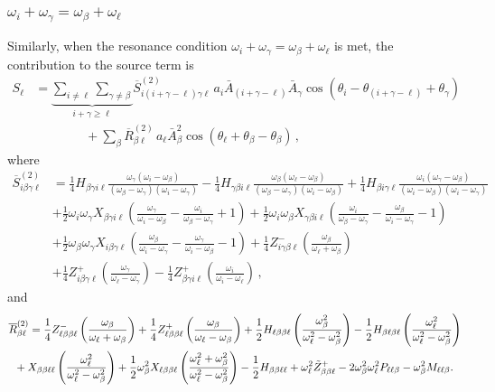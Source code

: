 \documentclass[letterpaper,11pt]{article}
\newcommand{\oi}{\omega_i}
\newcommand{\ol}{\omega_\ell}
\newcommand{\obet}{\omega_{\beta}}
\newcommand{\ogam}{\omega_\gamma}
\begin{document}

\subsubsection{$\oi + \ogam = \obet + \ol$}
\label{ssec: intpluschi2}

Similarly, when the resonance condition $\oi + \ogam = \obet + \ol$ is met, the contribution to the source term is
\begin{align}
\label{intpluschi2 source}
S_\ell &= \underbrace{\sum_{i \neq \ell} \sum_{\gamma \neq \beta}}_{i + \gamma \geq \ell} \overline{S}^{(2)}_{i (i + \gamma - \ell) \gamma \ell} \, a_i \bar A_{(i + \gamma - \ell)} \bar A_\gamma \cos \left( \theta_i - \theta_{(i + \gamma - \ell)}  + \theta_\gamma \right) \nonumber \\
%
& \qquad \qquad + \sum_\beta \overline{R}^{(2)}_{\beta\ell} \, a_\ell \bar A_\beta^2 \cos \left( \theta_\ell + \theta_\beta - \theta_\beta \right) \, ,
\end{align}
where
\begin{align}
\overline{S}^{(2)}_{i\beta\gamma\ell} &= \frac{1}{4} H_{\beta\gamma i\ell} \frac{\ogam (\oi - \obet)}{(\obet - \ogam)(\oi - \ogam)} - \frac{1}{4} H_{\gamma\beta i \ell} \frac{\obet(\ol - \obet)}{(\obet - \ogam)(\oi - \obet)} + \frac{1}{4} H_{\beta i \gamma\ell} \frac{\oi (\ogam - \obet)}{(\oi - \obet)(\oi - \ogam)} \nonumber \\
%
& + \frac{1}{2} \oi \ogam X_{\beta\gamma i \ell} \left( \frac{\ogam}{\oi - \obet} - \frac{\oi}{\obet - \ogam} + 1 \right) + \frac{1}{2} \oi \obet X_{\gamma\beta i \ell} \left( \frac{\oi}{\obet - \ogam} - \frac{\obet}{\oi - \ogam} - 1 \right) \nonumber \\
%
& + \frac{1}{2} \obet \ogam X_{i\beta\gamma\ell} \left( \frac{\obet}{\oi - \ogam} - \frac{\ogam}{\oi - \obet} - 1 \right)  + \frac{1}{4} Z^-_{i\gamma\beta\ell} \left( \frac{\obet}{\ol + \obet}\right)  \nonumber \\
%
&
+ \frac{1}{4} Z^+_{i\beta\gamma\ell} \left( \frac{\ogam}{\ol - \ogam}\right) - \frac{1}{4}Z^+_{\beta\gamma i \ell} \left( \frac{\oi}{\oi - \ol} \right) \, ,
\end{align}
and
\begin{align}
\overline{R}^{(2)}_{\beta\ell} &= \frac{1}{4} Z^-_{\ell\beta\beta\ell} \left( \frac{\obet}{\ol + \obet} \right) + \frac{1}{4} Z^+_{\ell\beta\beta\ell} \left( \frac{\obet}{\ol - \obet} \right) + \frac{1}{2} H_{\ell\beta\beta\ell} \left( \frac{\obet^2}{\ol^2 - \obet^2} \right) - \frac{1}{2} H_{\beta\ell\beta\ell} \left( \frac{\ol^2}{\ol^2 - \obet^2} \right) \nonumber \\
%
& \!\!\!\!\!\!\!\! + X_{\beta\beta\ell\ell} \left( \frac{\ol^2}{\ol^2 - \obet^2} \right) + \frac{1}{2} \obet^2 X_{\ell\beta\beta\ell} \left( \frac{\ol^2 + \obet^2}{\ol^2 - \obet^2} \right) - \frac{1}{2} H_{\beta\beta\ell\ell} +  \ol^2 \tilde{Z}^+_{\beta\beta\ell} - 2 \obet^2 \ol^2 P_{\ell\ell\beta} - \obet^2 M_{\ell\ell\beta} . \vspace{-0.3in}
\end{align}
\end{document}
